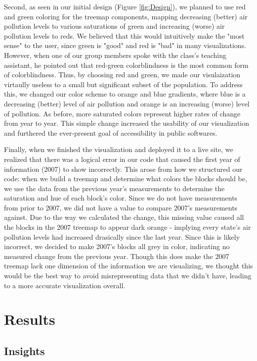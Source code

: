 \documentclass[journal]{vgtc}                %
\begin{document}
Second, as seen in our initial design (Figure \ref{fig:Design}), we planned to use red and green coloring for the treemap components, mapping
decreasing (better) air pollution levels to various saturations of green and increasing (worse) air pollution levels to reds. We believed
that this would intuitively make the "most sense" to the user, since green is "good" and red is "bad" in many visualizations. However, when
one of our group members spoke with the class's teaching assistant, he pointed out that red-green colorblindness is the most common form of
colorblindness. Thus, by choosing red and green, we made our visulaization virtaully useless to a small but significant subset of the population.
To address this, we changed our color scheme to orange and blue gradients, where blue is a decreasing (better) level of air pollution and orange
is an increasing (worse) level of pollution. As before, more saturated colors represent higher rates of change from year to year. This simple change
increased the usability of our visualization and furthered the ever-present goal of accessibility in public softwares.

Finally, when we finished the visualization and deployed it to a live site, we realized that there was a logical error in our code
that caused the first year of information (2007) to show incorrectly. This arose from how we structured our code: when we build a 
treemap and determine what colors the blocks should be, we use the data from the previous year's measurements to determine the saturation
and hue of each block's color. Since we do not have measurements from prior to 2007, we did not have a value to compare 2007's measurements
against. Due to the way we calculated the change, this missing value caused all the blocks in the 2007 treemap to appear dark orange - implying
every state's air pollution levels had increased drasically since the last year. Since this is likely incorrect, we decided to make 2007's blocks
all grey in color, indicating no measured change from the previous year. Though this does make the 2007 treemap lack one dimension of the information
we are visualizing, we thought this would be the best way to avoid misrepresenting data that we didn't have, leading to a more accurate
visualization overall.

\section{Results}

\subsection{Insights}
\end{document}
